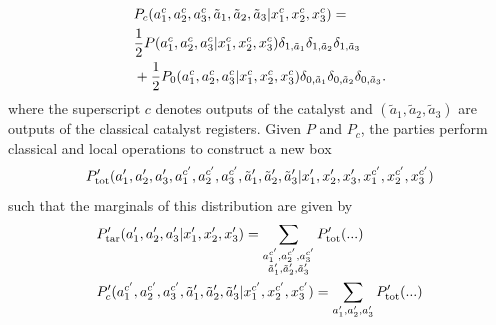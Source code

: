 \documentclass[pra,aps,reprint,superscriptaddress]{revtex4-2}
\theoremstyle{theorem}
\begin{document}
\begin{align}\nonumber
    &P_c(a^c_1,a^c_2,a^c_3,\Tilde{a}_1,\Tilde{a}_2,\Tilde{a}_3|x^c_1,x^c_2,x^c_3) =\\ \nonumber &\frac{1}{2}P(a^c_1,a^c_2,a^c_3|x^c_1,x^c_2,x^c_3)\delta_{1,\Tilde{a}_1}\delta_{1,\Tilde{a}_2}\delta_{1,\Tilde{a}_3}\\&
    + \frac{1}{2}P_0(a^c_1,a^c_2,a^c_3|x^c_1,x^c_2,x^c_3)\delta_{0,\Tilde{a}_1}\delta_{0,\Tilde{a}_2}\delta_{0,\Tilde{a}_3}.
\end{align}
where the superscript $c$ denotes outputs of the catalyst and $(\tilde a_1,\tilde a_2, \tilde a_3)$ are outputs of the classical catalyst registers. Given $P$ and $P_c$, the parties perform classical and local operations to construct a new box 
\begin{equation}\nonumber
    P_{\mathrm{tot}}^{ \prime}(a^{\prime}_1,a^{\prime}_2,a^{\prime}_3,a^{c^\prime}_1,a^{c^\prime}_2,a^{c^\prime}_3,\Tilde{a}^\prime_1,\Tilde{a}^\prime_2,\Tilde{a}^\prime_3|x^{\prime}_1,x^{\prime}_2,x^{\prime}_3,x^{c^\prime}_1,x^{c^\prime}_2,x^{c^\prime}_3)
\end{equation}
such that the marginals of this distribution are given by
\begin{align}\nonumber
&P_{\mathrm{tar}}^{\prime}(a^{\prime}_1,a^{\prime}_2,a^{\prime}_3|x^{\prime}_1,x^{\prime}_2,x^{\prime}_3)=\sum_{\substack{a^{c^\prime}_1,a^{c^\prime}_2,a^{c^\prime}_3\\\Tilde{a}^\prime_1,\Tilde{a}^\prime_2,\Tilde{a}^\prime_3}} P_{\text{tot}}^{\prime}(...)
\\&P_c^{\prime}(a^{c^\prime}_1,a^{c^\prime}_2,a^{c^\prime}_3,\Tilde{a}^\prime_1,\Tilde{a}^\prime_2,\Tilde{a}^\prime_3|x^{c^\prime}_1,x^{c^\prime}_2,x^{c^\prime}_3)= \sum_{a^{\prime}_1,a^{\prime}_2,a^{\prime}_3}P_{\text{tot}}^{\prime}(...)
\end{align}
\end{document}
